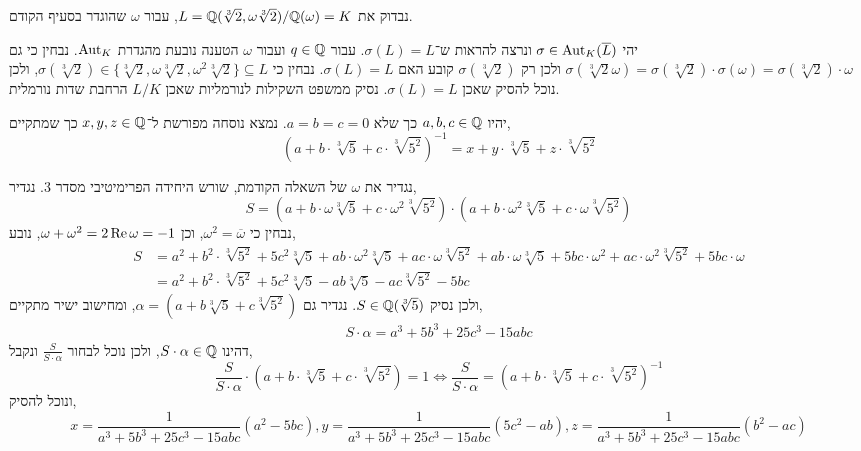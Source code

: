 \subquestion{}
נבדוק את $L = \mathbb{Q}(\sqrt[3]{2}, \omega \sqrt[3]{2}) / \mathbb{Q}(\omega) = K$, עבור $\omega$ שהוגדר בסעיף הקודם.
\begin{solution}
	יהי $\sigma \in \operatorname{Aut}_K(\overline{L})$ ונרצה להראות ש־$\sigma(L) = L$.
	עבור $q \in \mathbb{Q}$ ועבור $\omega$ הטענה נובעת מהגדרת $\operatorname{Aut}_K$.
	נבחין כי גם $\sigma(\sqrt[3]{2} \omega) = \sigma(\sqrt[3]{2}) \cdot \sigma(\omega) = \sigma(\sqrt[3]{2}) \cdot \omega$ ולכן רק $\sigma(\sqrt[3]{2})$ קובע האם $\sigma(L) = L$.
	נבחין כי $\sigma(\sqrt[3]{2}) \in \{ \sqrt[3]{2}, \omega \sqrt[3]{2}, \omega^2 \sqrt[3]{2} \} \subseteq L$, ולכן נוכל להסיק שאכן $\sigma(L) = L$.
	נסיק ממשפט השקילות לנורמליות שאכן $L / K$ הרחבת שדות נורמלית.
\end{solution}

\question{}
יהיו $a, b, c \in \mathbb{Q}$ כך שלא $a = b = c = 0$.
נמצא נוסחה מפורשת ל־$x, y, z \in \mathbb{Q}$ כך שמתקיים,
\[
	{(a + b \cdot \sqrt[3]{5} + c \cdot \sqrt[3]{5^2})}^{-1}
	= x + y \cdot \sqrt[3]{5} + z \cdot \sqrt[3]{5^2}
\]
\begin{solution}
	נגדיר את $\omega$ של השאלה הקודמת, שורש היחידה הפרימיטיבי מסדר 3.
	נגדיר,
	\[
		S
		= (a + b \cdot \omega \sqrt[3]{5} + c \cdot \omega^2 \sqrt[3]{5^2}) \cdot (a + b \cdot \omega^2 \sqrt[3]{5} + c \cdot \omega \sqrt[3]{5^2})
	\]
	נבחין כי $\omega^2 = \overline{\omega}$, וכן $\omega + \omega^2 = 2 \operatorname{Re} \omega = -1$, נובע,
	\begin{align*}
		S & = a^2 + b^2 \cdot \sqrt[3]{5^2} + 5 c^2 \sqrt[3]{5}
		+ a b \cdot \omega^2 \sqrt[3]{5} + a c \cdot \omega \sqrt[3]{5^2}
		+ a b \cdot \omega \sqrt[3]{5} + 5 b c \cdot \omega^2
		+ a c \cdot \omega^2 \sqrt[3]{5^2} + 5 b c \cdot \omega \\
		& = a^2 + b^2 \cdot \sqrt[3]{5^2} + 5 c^2 \sqrt[3]{5}
		- a b \sqrt[3]{5} - a c \sqrt[3]{5^2} - 5 b c
	\end{align*}
	ולכן נסיק $S \in \mathbb{Q}(\sqrt[3]{5})$.
	נגדיר גם $\alpha = (a + b \sqrt[3]{5} + c \sqrt[3]{5^2})$, ומחישוב ישיר מתקיים,
	\begin{align*}
		S \cdot \alpha
		= a^3 + 5 b^3 + 25 c^3 - 15 a b c
	\end{align*}
	דהינו $S \cdot \alpha \in \mathbb{Q}$, ולכן נוכל לבחור $\frac{S}{S \cdot \alpha}$ ונקבל,
	\[
		\frac{S}{S \cdot \alpha}
		\cdot (a + b \cdot \sqrt[3]{5} + c \cdot \sqrt[3]{5^2})
		= 1
		\iff
		\frac{S}{S \cdot \alpha}
		= {(a + b \cdot \sqrt[3]{5} + c \cdot \sqrt[3]{5^2})}^{-1}
	\]
	ונוכל להסיק,
	\[
		x = \frac{1}{a^3 + 5 b^3 + 25 c^3 - 15 a b c} (a^2 - 5 b c),
		y = \frac{1}{a^3 + 5 b^3 + 25 c^3 - 15 a b c} (5 c^2 - a b),
		z = \frac{1}{a^3 + 5 b^3 + 25 c^3 - 15 a b c} (b^2 - a c)
	\]
\end{solution}


